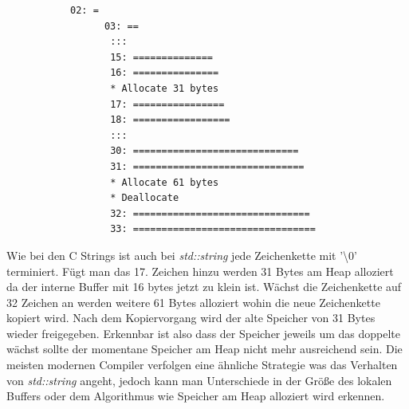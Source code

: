 \documentclass[MES,Master,ngerman]{twbook}%
\begin{document}
\begin{figure}[!htb]
	\begin{subfigure}[b]{0.5\textwidth}
		
		\label{lst:10}
	\end{subfigure}
	\begin{subfigure}[b]{0.5\textwidth}
	\begin{lstlisting}[gobble=6, title={Ausgabe Quellcode (20)}, language=bash, numbers=none]
	   02: =                                                                           
 	  03: ==                                                                          
	   :::                                                               
	   15: ==============                                                              
	   16: ===============                                                             
	   * Allocate 31 bytes                                                             
	   17: ================                                                            
	   18: =================                                                           
	   :::                                            
	   30: =============================                                               
	   31: ==============================                                              
	   * Allocate 61 bytes                                                             
	   * Deallocate                                                                    
	   32: ===============================                                               
	   33: ================================                                             	
	\end{lstlisting}
	\end{subfigure}
\end{figure}

Wie bei den C Strings ist auch bei \textit{std::string} jede Zeichenkette mit '\textbackslash 0' terminiert. Fügt man das 17. Zeichen hinzu werden 31 Bytes am Heap alloziert da der interne Buffer mit 16 bytes jetzt zu klein ist. Wächst die Zeichenkette auf 32 Zeichen an werden weitere 61 Bytes alloziert wohin die neue Zeichenkette kopiert wird. Nach dem Kopiervorgang wird der alte Speicher von 31 Bytes wieder freigegeben. Erkennbar ist also dass der Speicher jeweils um das doppelte wächst sollte der momentane Speicher am Heap nicht mehr ausreichend sein. Die meisten modernen Compiler verfolgen eine ähnliche Strategie was das Verhalten von \textit{std::string} angeht, jedoch kann man Unterschiede in der Größe des lokalen Buffers oder dem Algorithmus wie Speicher am Heap alloziert wird erkennen. \newpage
\end{document}
